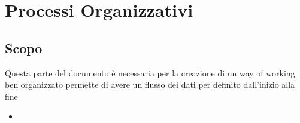 \section{Processi Organizzativi}
  \subsection{Scopo}
  Questa parte del documento \`e necessaria per la creazione di un way of working ben organizzato
  permette di avere un flusso dei dati per definito dall'inizio alla fine
  \begin{itemize}
  \item
  \end{itemize}

